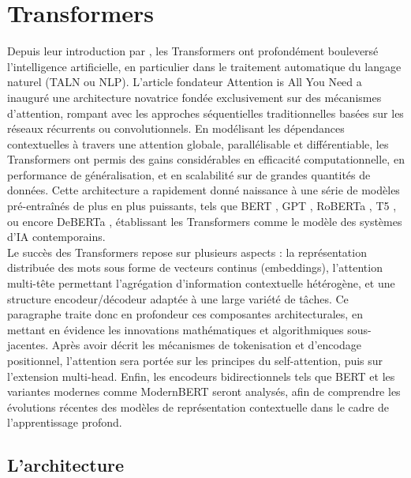\section{Transformers}

Depuis leur introduction par \citep{vaswani2017attention}, les Transformers ont profondément bouleversé l’intelligence artificielle, en particulier dans le traitement automatique du langage naturel (TALN ou NLP). L’article fondateur Attention is All You Need a inauguré une architecture novatrice fondée exclusivement sur des mécanismes d’attention, rompant avec les approches séquentielles traditionnelles basées sur les réseaux récurrents ou convolutionnels. En modélisant les dépendances contextuelles à travers une attention globale, parallélisable et différentiable, les Transformers ont permis des gains considérables en efficacité computationnelle, en performance de généralisation, et en scalabilité sur de grandes quantités de données. Cette architecture a rapidement donné naissance à une série de modèles pré-entraînés de plus en plus puissants, tels que BERT \citep{devlin2018bert}, GPT \citep{radford2018gpt1,radford2019gpt2}, RoBERTa \citep{liu2019roberta}, T5 \citep{raffel2020t5}, ou encore DeBERTa \citep{he2021deberta}, établissant les Transformers comme le modèle des systèmes d’IA contemporains.\\

Le succès des Transformers repose sur plusieurs aspects : la représentation distribuée des mots sous forme de vecteurs continus (embeddings), l’attention multi-tête permettant l’agrégation d’information contextuelle hétérogène, et une structure encodeur/décodeur adaptée à une large variété de tâches. Ce paragraphe traite donc  en profondeur ces composantes architecturales, en mettant en évidence les innovations mathématiques et algorithmiques sous-jacentes. Après avoir décrit les mécanismes de tokenisation et d'encodage positionnel, l'attention sera portée sur les principes du self-attention, puis sur l'extension multi-head. Enfin, les encodeurs bidirectionnels tels que BERT et les variantes modernes comme ModernBERT \citep{warner2024modernbert} seront analysés, afin de comprendre les évolutions récentes des modèles de représentation contextuelle dans le cadre de l'apprentissage profond.

\subsection{L'architecture}

